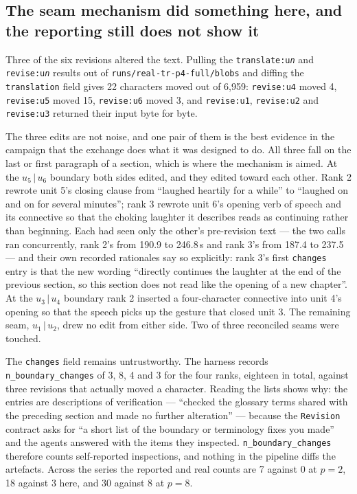 \documentclass[11pt]{article}
\begin{document}
\subsection*{The seam mechanism did something here, and the reporting still does not show it}

Three of the six revisions altered the text. Pulling the \texttt{translate:u\emph{n}} and
\texttt{revise:u\emph{n}} results out of \texttt{runs/real-tr-p4-full/blobs} and diffing the
\texttt{translation} field gives 22 characters moved out of 6{,}959: \texttt{revise:u4} moved 4,
\texttt{revise:u5} moved 15, \texttt{revise:u6} moved 3, and \texttt{revise:u1},
\texttt{revise:u2} and \texttt{revise:u3} returned their input byte for byte.

The three edits are not noise, and one pair of them is the best evidence in the campaign that the
exchange does what it was designed to do. All three fall on the last or first paragraph of a
section, which is where the mechanism is aimed. At the $u_5\,|\,u_6$ boundary both sides edited,
and they edited toward each other. Rank 2 rewrote unit 5's closing clause from ``laughed heartily
for a while'' to ``laughed on and on for several minutes''; rank 3 rewrote unit 6's opening verb
of speech and its connective so that the choking laughter it describes reads as continuing rather
than beginning. Each had seen only the other's pre-revision text --- the two calls ran
concurrently, rank 2's from 190.9 to 246.8\,s and rank 3's from 187.4 to 237.5 --- and their own
recorded rationales say so explicitly: rank 3's first \texttt{changes} entry is that the new
wording ``directly continues the laughter at the end of the previous section, so this section does
not read like the opening of a new chapter''. At the $u_3\,|\,u_4$ boundary rank 2 inserted a
four-character connective into unit 4's opening so that the speech picks up the gesture that
closed unit 3. The remaining seam, $u_1\,|\,u_2$, drew no edit from either side. Two of three
reconciled seams were touched.

The \texttt{changes} field remains untrustworthy. The harness records
\texttt{n\_boundary\_changes} of 3, 8, 4 and 3 for the four ranks, eighteen in total, against
three revisions that actually moved a character. Reading the lists shows why: the entries are
descriptions of verification --- ``checked the glossary terms shared with the preceding section
and made no further alteration'' --- because the \texttt{Revision} contract asks for ``a short
list of the boundary or terminology fixes you made'' and the agents answered with the items they
inspected. \texttt{n\_boundary\_changes} therefore counts self-reported inspections, and nothing
in the pipeline diffs the artefacts. Across the series the reported and real counts are 7 against
0 at $p=2$, 18 against 3 here, and 30 against 8 at $p=8$.
\end{document}
